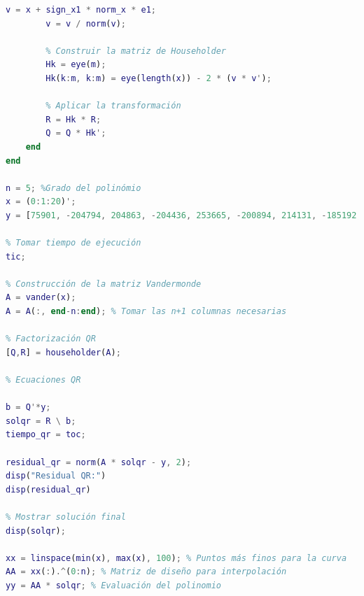 \begin{homeworkProblem}
\begin{solucion}
\begin{enumerate}
\begin{lstlisting}[language = matlab]
        v = x + sign_x1 * norm_x * e1;
        v = v / norm(v);
        
        % Construir la matriz de Householder
        Hk = eye(m);
        Hk(k:m, k:m) = eye(length(x)) - 2 * (v * v');
        
        % Aplicar la transformación
        R = Hk * R;
        Q = Q * Hk';
    end
end

n = 5; %Grado del polinómio
x = (0:1:20)';
y = [75901, -204794, 204863, -204436, 253665, -200894, 214131, -185192, 221249, -138370, 315911, -27644, 455253, 197434, 783995, 608816, 1370781, 1303798, 2205519, 2408860, 3444321]';

% Tomar tiempo de ejecución
tic;

% Construcción de la matriz Vandermonde
A = vander(x);
A = A(:, end-n:end); % Tomar las n+1 columnas necesarias

% Factorización QR
[Q,R] = householder(A);

% Ecuaciones QR

b = Q'*y;
solqr = R \ b;
tiempo_qr = toc;

residual_qr = norm(A * solqr - y, 2);
disp("Residual QR:")
disp(residual_qr)

% Mostrar solución final
disp(solqr);

xx = linspace(min(x), max(x), 100); % Puntos más finos para la curva
AA = xx(:).^(0:n); % Matriz de diseño para interpolación
yy = AA * solqr; % Evaluación del polinomio


\end{lstlisting}
\end{enumerate}
\end{solucion}
\end{homeworkProblem}
